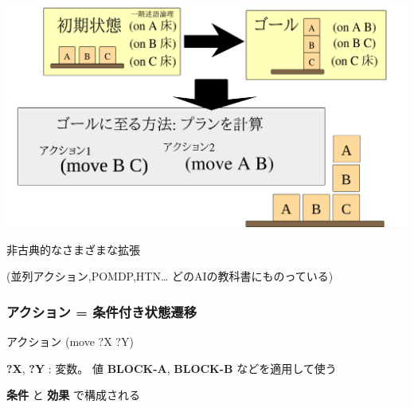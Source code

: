 \includegraphics{img/plan.png}
\begin{larger}
非古典的なさまざまな拡張

\begin{alignright}
(並列アクション,POMDP,HTN\ldots{} どのAIの教科書にものっている)
\end{alignright}
\end{larger}

\subsubsection{アクション = 条件付き状態遷移}
\label{sec:orgheadline51}

\begin{center}
\begin{xlarge}
アクション (move ?X ?Y)
\end{xlarge}
\end{center}

\begin{center}
\textbf{?X}, \textbf{?Y} : 変数。 値 \textbf{BLOCK-A}, \textbf{BLOCK-B} などを適用して使う

\textbf{条件} と \textbf{効果} で構成される
\end{center}


